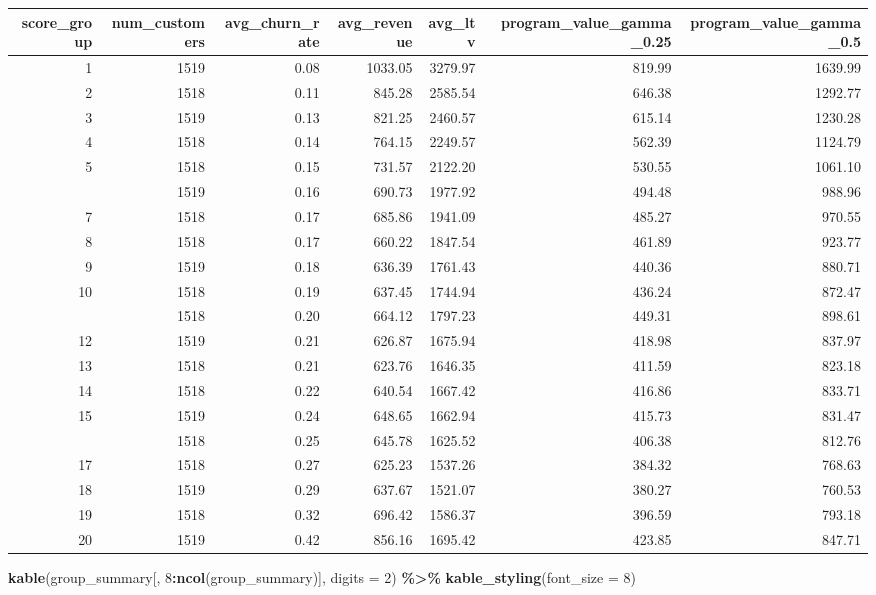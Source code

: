 \documentclass[
]{article}
\newenvironment{Shaded}{\begin{snugshade}}{\end{snugshade}}
\newcommand{\AttributeTok}[1]{\textcolor[rgb]{0.13,0.29,0.53}{#1}}
\newcommand{\DecValTok}[1]{\textcolor[rgb]{0.00,0.00,0.81}{#1}}
\newcommand{\FunctionTok}[1]{\textcolor[rgb]{0.13,0.29,0.53}{\textbf{#1}}}
\newcommand{\NormalTok}[1]{#1}
\newcommand{\SpecialCharTok}[1]{\textcolor[rgb]{0.81,0.36,0.00}{\textbf{#1}}}
\begin{document}
\begingroup\fontsize{8}{10}\selectfont

\begin{longtable}[t]{rrrrrrr}
\toprule
score\_group & num\_customers & avg\_churn\_rate & avg\_revenue & avg\_ltv & program\_value\_gamma\_0.25 & program\_value\_gamma\_0.5\\
\midrule
1 & 1519 & 0.08 & 1033.05 & 3279.97 & 819.99 & 1639.99\\
2 & 1518 & 0.11 & 845.28 & 2585.54 & 646.38 & 1292.77\\
3 & 1519 & 0.13 & 821.25 & 2460.57 & 615.14 & 1230.28\\
4 & 1518 & 0.14 & 764.15 & 2249.57 & 562.39 & 1124.79\\
5 & 1518 & 0.15 & 731.57 & 2122.20 & 530.55 & 1061.10\\
\addlinespace
6 & 1519 & 0.16 & 690.73 & 1977.92 & 494.48 & 988.96\\
7 & 1518 & 0.17 & 685.86 & 1941.09 & 485.27 & 970.55\\
8 & 1518 & 0.17 & 660.22 & 1847.54 & 461.89 & 923.77\\
9 & 1519 & 0.18 & 636.39 & 1761.43 & 440.36 & 880.71\\
10 & 1518 & 0.19 & 637.45 & 1744.94 & 436.24 & 872.47\\
\addlinespace
11 & 1518 & 0.20 & 664.12 & 1797.23 & 449.31 & 898.61\\
12 & 1519 & 0.21 & 626.87 & 1675.94 & 418.98 & 837.97\\
13 & 1518 & 0.21 & 623.76 & 1646.35 & 411.59 & 823.18\\
14 & 1518 & 0.22 & 640.54 & 1667.42 & 416.86 & 833.71\\
15 & 1519 & 0.24 & 648.65 & 1662.94 & 415.73 & 831.47\\
\addlinespace
16 & 1518 & 0.25 & 645.78 & 1625.52 & 406.38 & 812.76\\
17 & 1518 & 0.27 & 625.23 & 1537.26 & 384.32 & 768.63\\
18 & 1519 & 0.29 & 637.67 & 1521.07 & 380.27 & 760.53\\
19 & 1518 & 0.32 & 696.42 & 1586.37 & 396.59 & 793.18\\
20 & 1519 & 0.42 & 856.16 & 1695.42 & 423.85 & 847.71\\
\bottomrule
\end{longtable}
\endgroup{}

\begin{Shaded}
\begin{Highlighting}[]
\FunctionTok{kable}\NormalTok{(group\_summary[, }\DecValTok{8}\SpecialCharTok{:}\FunctionTok{ncol}\NormalTok{(group\_summary)], }\AttributeTok{digits =} \DecValTok{2}\NormalTok{) }\SpecialCharTok{\%\textgreater{}\%}
  \FunctionTok{kable\_styling}\NormalTok{(}\AttributeTok{font\_size =} \DecValTok{8}\NormalTok{)}
\end{Highlighting}
\end{Shaded}
\end{document}
